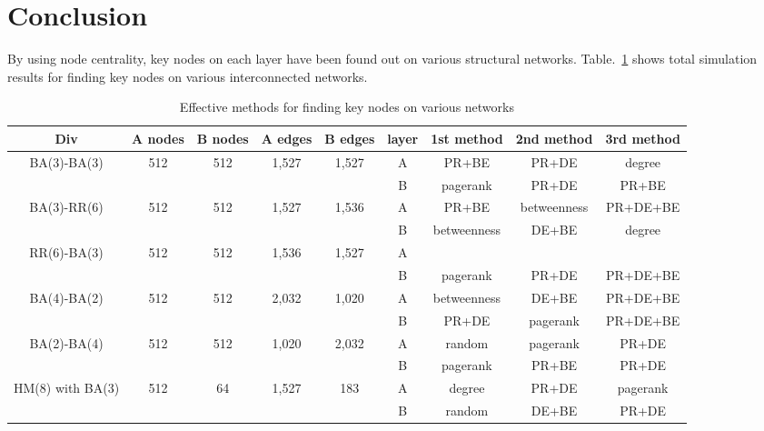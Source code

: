 \section{Conclusion}
By using node centrality, key nodes on each layer have been found out on various structural networks. Table.~\ref{effective methods} shows total simulation results for finding key nodes on various interconnected networks. 
\begin{table}[!htb]
	\scriptsize
	\centering
	\caption{Effective methods for finding key nodes on various networks}
	\label{effective methods}
	\begin{center}
		\begin{tabular}{c|c|c|c|c|c|c|c|c} \hline\hline
		  Div                              & A nodes & B nodes & A edges & B edges & layer & 1st method & 2nd method  & 3rd method  \\ \hline \hline
         \multirow{1}{*}{BA(3)-BA(3)}      & 512 	 & 512     & 1,527   & 1,527   & A     & PR+BE      & PR+DE       & degree      \\ 
			                               &  	     &         &         &         & B     & pagerank   & PR+DE       & PR+BE       \\ \hline   
	     \multirow{1}{*}{BA(3)-RR(6)}      & 512     & 512     & 1,527   & 1,536   & A     & PR+BE      & betweenness & PR+DE+BE  \\
	                                       &         &         &         &         & B     & betweenness& DE+BE       & degree      \\ \hline
	     \multirow{1}{*}{RR(6)-BA(3)}      & 512     & 512     & 1,536   & 1,527   & A     &            &             &             \\ 
	                                       &         &         &         &         & B     & pagerank   & PR+DE       & PR+DE+BE    \\ \hline
	   
		 \multirow{1}{*}{BA(4)-BA(2)}      & 512     & 512     & 2,032   & 1,020   & A     & betweenness& DE+BE       & PR+DE+BE    \\ 
		                                   &         &         &         &         & B     & PR+DE      & pagerank    & PR+DE+BE    \\ \hline
		 \multirow{1}{*}{BA(2)-BA(4)}      & 512     & 512     & 1,020   & 2,032   & A     & random     & pagerank    & PR+DE       \\ 
		                                   &         &         &         &         & B     & pagerank   & PR+BE       & PR+DE       \\ \hline
		 \multirow{1}{*}{HM(8) with BA(3)} & 512     & 64      & 1,527   & 183     & A     & degree     & PR+DE       & pagerank    \\ 
		                                   &         &         &         &         & B     & random     & DE+BE       & PR+DE       \\ \hline
			\hline
		\end{tabular}
	\end{center}
\end{table}
